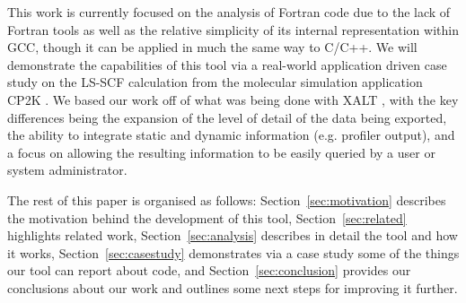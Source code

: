 This work is currently focused on the analysis of Fortran code due to the lack of Fortran tools as well as the relative simplicity of its internal representation within \acs{GCC}, though it can be applied in much the same way to C/C++.
We will demonstrate the capabilities of this tool via a real-world application driven case study on the \ac{LS-SCF} calculation \cite{vandevondele2012linear} from the molecular simulation application CP2K \cite{hutter2014cp2k}.
We based our work off of what was being done with XALT \cite{7081224}, with the key differences being the expansion of the level of detail of the data being exported, the ability to integrate static and dynamic information (e.g. profiler output), and a focus on allowing the resulting information to be easily queried by a user or system administrator.

The rest of this paper is organised as follows: Section~\ref{sec:motivation} describes the motivation behind the development of this tool, Section~\ref{sec:related} highlights related work, Section~\ref{sec:analysis} describes in detail the tool and how it works, Section~\ref{sec:casestudy} demonstrates via a case study some of the things our tool can report about code, and Section~\ref{sec:conclusion} provides our conclusions about our work and outlines some next steps for improving it further.
